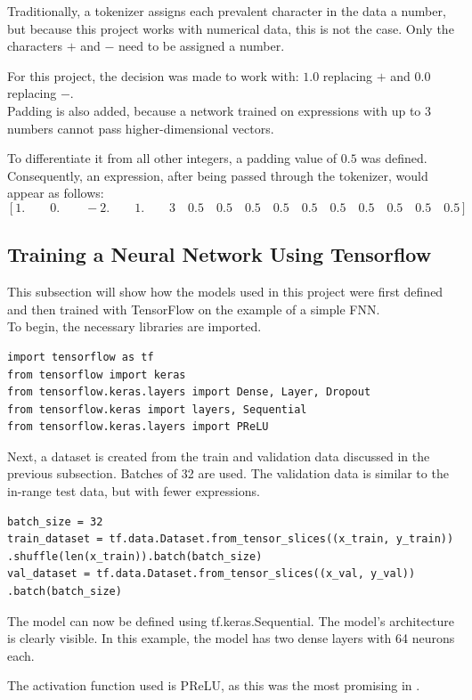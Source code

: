 \documentclass{article}
\begin{document}
Traditionally, a tokenizer assigns each prevalent character in the data a number, but because this project works with numerical data, this is not the case. Only the characters $+$ and $-$ need to be assigned a number.

For this project, the decision was made to work with: $1.0$ replacing $+$ and $0.0$ replacing $-$.
\\[2em]

Padding is also added, because a network trained on expressions with up to 3 numbers cannot pass higher-dimensional vectors.

To differentiate it from all other integers, a padding value of $0.5$ was defined.
\\[2em]
Consequently, an expression, after being passed through the tokenizer, would appear as follows:
$$
[1.\qquad 0.\qquad -2.\qquad 1.\qquad 3\quad 0.5\quad 0.5\quad 0.5\quad 0.5\quad 0.5\quad 0.5\quad 0.5\quad 0.5\quad 0.5\quad 0.5]
$$
\subsection{Training a Neural Network Using Tensorflow}
This subsection will show how the models used in this project were first defined and then trained with TensorFlow on the example of a simple FNN.
\\[2em]
To begin, the necessary libraries are imported.
\begin{Verbatim}
import tensorflow as tf
from tensorflow import keras
from tensorflow.keras.layers import Dense, Layer, Dropout
from tensorflow.keras import layers, Sequential
from tensorflow.keras.layers import PReLU
\end{Verbatim}

Next, a dataset is created from the train and validation data discussed in the previous subsection. Batches of 32 are used. The validation data is similar to the in-range test data, but with fewer expressions.
\begin{Verbatim}
batch_size = 32
train_dataset = tf.data.Dataset.from_tensor_slices((x_train, y_train))
.shuffle(len(x_train)).batch(batch_size)
val_dataset = tf.data.Dataset.from_tensor_slices((x_val, y_val))
.batch(batch_size)
\end{Verbatim}

The model can now be defined using tf.keras.Sequential. The model's architecture is clearly visible. In this example, the model has two dense layers with 64 neurons each.

The activation function used is PReLU, as this was the most promising in \cite{trask2018neuralarithmeticlogicunits}.
\end{document}
